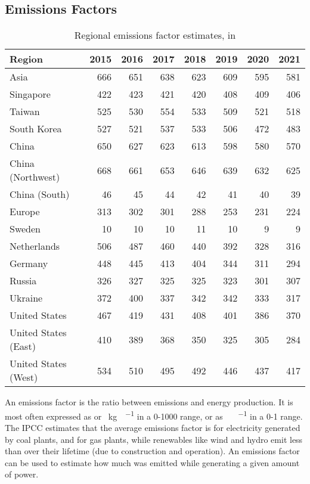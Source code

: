 \begin{appendices}
\section{Emissions Factors}
\label{appendix:emissions-factors}

\begin{table*}[htp]
\centering
\begin{tabular}{@{}lrrrrrrr@{}}
\toprule
Region               & 2015 & 2016 & 2017 & 2018 & 2019 & 2020 & 2021 \\ \midrule
Asia                 & 666  & 651  & 638  & 623  & 609  & 595  & 581  \\
Singapore            & 422  & 423  & 421  & 420  & 408  & 409  & 406  \\
Taiwan               & 525  & 530  & 554  & 533  & 509  & 521  & 518  \\
South Korea          & 527  & 521  & 537  & 533  & 506  & 472  & 483  \\
China                & 650  & 627  & 623  & 613  & 598  & 580  & 570  \\
China (Northwest)    & 668  & 661  & 653  & 646  & 639  & 632  & 625  \\
China (South)        & 46   & 45   & 44   & 42   & 41   & 40   & 39   \\
Europe               & 313  & 302  & 301  & 288  & 253  & 231  & 224  \\
Sweden               & 10   & 10   & 10   & 11   & 10   & 9    & 9    \\
Netherlands          & 506  & 487  & 460  & 440  & 392  & 328  & 316  \\
Germany              & 448  & 445  & 413  & 404  & 344  & 311  & 294  \\
Russia               & 326  & 327  & 325  & 325  & 323  & 301  & 307  \\
Ukraine              & 372  & 400  & 337  & 342  & 342  & 333  & 317  \\
United States        & 467  & 419  & 431  & 408  & 401  & 386  & 370  \\
United States (East) & 410  & 389  & 368  & 350  & 325  & 305  & 284  \\
United States (West) & 534  & 510  & 495  & 492  & 446  & 437  & 417  \\ \bottomrule
\end{tabular}
\caption{Regional emissions factor estimates, in \ef{}}
\label{tab:emissions-factors}
\end{table*}

An emissions factor is the ratio between \COtwo{} emissions and energy production. It is most often expressed as \ef{} or \SI{}{\kilo\gram\COtwo\per{\mega\watt\hour}} in a 0-1000 range, or as \SI{}{\ton\COtwo\per{\mega\watt\hour}} in a 0-1 range. The IPCC estimates\cite{ipcc_annex_2014} that the average emissions factor is  for electricity generated by coal plants, and  for gas plants, while renewables like wind and hydro emit less than \cite{moomaw_annex_2012} over their lifetime (due to construction and operation). An emissions factor can be used to estimate how much \COtwo{} was emitted while generating a given amount of power.


\end{appendices}
